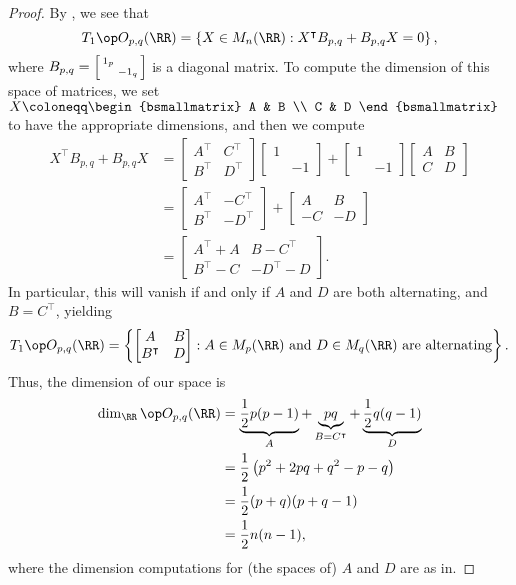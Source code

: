 \documentclass[../notes.tex]{subfiles}
\begin{document}
\begin{proof}
	By , we see that
	\[T_1\op O_{p,q}(\RR)=\left\{X\in M_n(\RR):X^\intercal B_{p,q}+B_{p,q}X=0\right\},\]
	where $B_{p,q}=\begin{bsmallmatrix}
		1_p \\ & -1_q
	\end{bsmallmatrix}$ is a diagonal matrix. To compute the dimension of this space of matrices, we set $X\coloneqq\begin{bsmallmatrix}
		A & B \\ C & D
	\end{bsmallmatrix}$ to have the appropriate dimensions, and then we compute
	\begin{align*}
		X^\intercal B_{p,q}+B_{p,q}X &= \begin{bmatrix}
			A^\intercal & C^\intercal \\ B^\intercal & D^\intercal
		\end{bmatrix}\begin{bmatrix}
			1 \\ & -1
		\end{bmatrix}+\begin{bmatrix}
			1 \\ & -1
		\end{bmatrix}\begin{bmatrix}
			A & B \\ C & D
		\end{bmatrix} \\
		&= \begin{bmatrix}
			A^\intercal & -C^\intercal \\ B^\intercal & -D^\intercal
		\end{bmatrix}+\begin{bmatrix}
			A & B \\ -C & -D
		\end{bmatrix} \\
		&= \begin{bmatrix}
			A^\intercal+A & B-C^\intercal \\ B^\intercal-C & -D^\intercal-D
		\end{bmatrix}.
	\end{align*}
	In particular, this will vanish if and only if $A$ and $D$ are both alternating, and $B=C^\intercal$, yielding
	\[T_1\op O_{p,q}(\RR)=\left\{\begin{bmatrix}
		A & B \\ B^\intercal & D
	\end{bmatrix}:A\in M_p(\RR)\text{ and }D\in M_q(\RR)\text{ are alternating}\right\}.\]
	Thus, the dimension of our space is
	\begin{align*}
		\dim_\RR\op O_{p,q}(\RR) &= \underbrace{\frac12p(p-1)}_A+\underbrace{pq}_{B=C^\intercal}+\underbrace{\frac12q(q-1)}_{D} \\
		&= \frac12\left(p^2+2pq+q^2-p-q\right) \\
		&= \frac12(p+q)(p+q-1) \\
		&= \frac12n(n-1),
	\end{align*}
	where the dimension computations for (the spaces of) $A$ and $D$ are as in.
\end{proof}
\end{document}
